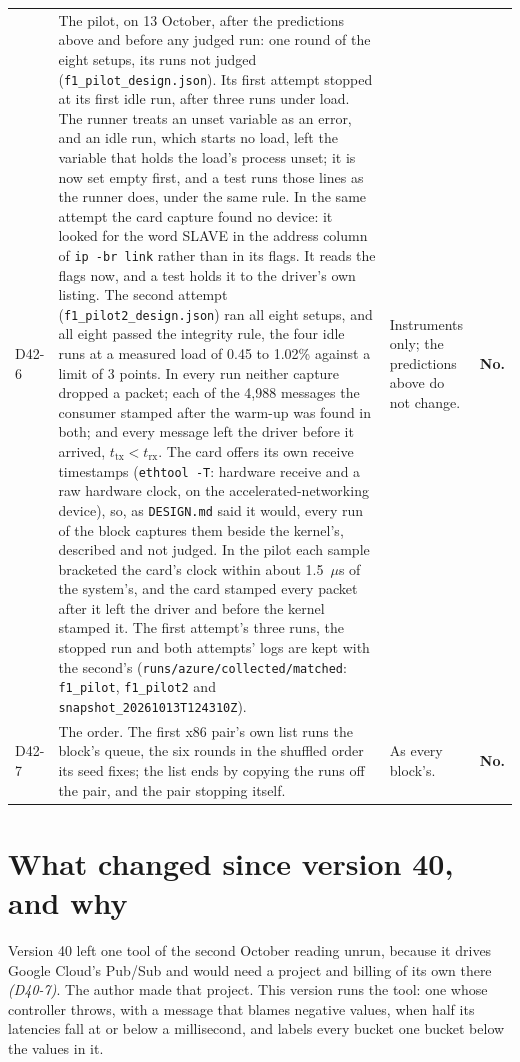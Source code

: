 \documentclass[11pt]{article}
\newcommand{\gl}[1]{{\color{soft}\itshape\small (#1)}}
\begin{document}
{\begin{longtable}{@{}p{1.1cm} >{\raggedright\arraybackslash}p{6.1cm} >{\raggedright\arraybackslash}p{6.0cm} >{\raggedright\arraybackslash}p{2.2cm}@{}}
D42-6 & The pilot, on 13 October, after the predictions above and before any judged run: one round of the eight setups, its runs not judged (\texttt{f1\_pilot\_design.json}). Its first attempt stopped at its first idle run, after three runs under load. The runner treats an unset variable as an error, and an idle run, which starts no load, left the variable that holds the load's process unset; it is now set empty first, and a test runs those lines as the runner does, under the same rule. In the same attempt the card capture found no device: it looked for the word SLAVE in the address column of \texttt{ip -br link} rather than in its flags. It reads the flags now, and a test holds it to the driver's own listing. The second attempt (\texttt{f1\_pilot2\_design.json}) ran all eight setups, and all eight passed the integrity rule, the four idle runs at a measured load of 0.45 to 1.02\% against a limit of 3 points. In every run neither capture dropped a packet; each of the 4,988 messages the consumer stamped after the warm-up was found in both; and every message left the driver before it arrived, $t_{\mathrm{tx}} < t_{\mathrm{rx}}$. The card offers its own receive timestamps (\texttt{ethtool -T}: hardware receive and a raw hardware clock, on the accelerated-networking device), so, as \texttt{DESIGN.md} said it would, every run of the block captures them beside the kernel's, described and not judged. In the pilot each sample bracketed the card's clock within about 1.5~$\mu$s of the system's, and the card stamped every packet after it left the driver and before the kernel stamped it. The first attempt's three runs, the stopped run and both attempts' logs are kept with the second's (\texttt{runs/azure/collected/matched}: \texttt{f1\_pilot}, \texttt{f1\_pilot2} and \texttt{snapshot\_20261013T124310Z}). & Instruments only; the predictions above do not change. & \textbf{No.} \\
D42-7 & The order. The first x86 pair's own list runs the block's queue, the six rounds in the shuffled order its seed fixes; the list ends by copying the runs off the pair, and the pair stopping itself. & As every block's. & \textbf{No.} \\
\bottomrule
\end{longtable}}

\section*{What changed since version 40, and why}
Version 40 left one tool of the second October reading unrun, because it drives Google Cloud's
Pub/Sub and would need a project and billing of its own there \gl{D40-7}. The author made that
project. This version runs the tool: one whose controller throws, with a message that blames
negative values, when half its latencies fall at or below a millisecond, and labels every bucket one
bucket below the values in it.
\end{document}
